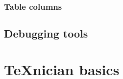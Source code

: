         \subsubsection{Table columns}
        \label{sec:tutorial/latex/custom/table}
        
        
    \subsection{Debugging tools}
    \label{sec:tutorial/latex/debug}
    

\newpage    
\section{\TeX{}nician basics}
\label{sec:tutorial/texnician}


    
    
    
    
    
    
